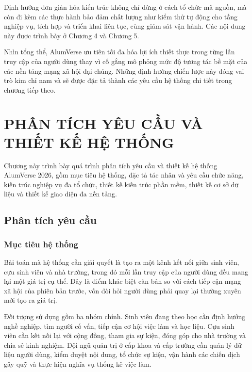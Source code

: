 \documentclass[12pt,a4paper,oneside]{report}
\begin{document}
Định hướng đơn giản hóa kiến trúc không chỉ dừng ở cách tổ chức mã nguồn, mà còn đi kèm các thực hành bảo đảm chất lượng như kiểm thử tự động cho tầng nghiệp vụ, tích hợp và triển khai liên tục, cùng giám sát vận hành. Các nội dung này được trình bày ở Chương 4 và Chương 5.

Nhìn tổng thể, AlumVerse ưu tiên tối đa hóa lợi ích thiết thực trong từng lần truy cập của người dùng thay vì cố gắng mô phỏng mức độ tương tác bề mặt của các nền tảng mạng xã hội đại chúng. Những định hướng chiến lược này đóng vai trò kim chỉ nam và sẽ được đặc tả thành các yêu cầu hệ thống chi tiết trong chương tiếp theo.

\chapter{PHÂN TÍCH YÊU CẦU VÀ THIẾT KẾ HỆ THỐNG}

Chương này trình bày quá trình phân tích yêu cầu và thiết kế hệ thống AlumVerse 2026, gồm mục tiêu hệ thống, đặc tả tác nhân và yêu cầu chức năng, kiến trúc nghiệp vụ đa tổ chức, thiết kế kiến trúc phần mềm, thiết kế cơ sở dữ liệu và thiết kế giao diện đa nền tảng.

\section{Phân tích yêu cầu}

\subsection{Mục tiêu hệ thống}

Bài toán mà hệ thống cần giải quyết là tạo ra một kênh kết nối giữa sinh viên, cựu sinh viên và nhà trường, trong đó mỗi lần truy cập của người dùng đều mang lại một giá trị cụ thể. Đây là điểm khác biệt căn bản so với cách tiếp cận mạng xã hội của phiên bản trước, vốn đòi hỏi người dùng phải quay lại thường xuyên mới tạo ra giá trị.

Đối tượng sử dụng gồm ba nhóm chính. Sinh viên đang theo học cần định hướng nghề nghiệp, tìm người cố vấn, tiếp cận cơ hội việc làm và học liệu. Cựu sinh viên cần kết nối lại với cộng đồng, tham gia sự kiện, đóng góp cho nhà trường và chia sẻ kinh nghiệm. Đội ngũ quản trị ở cấp khoa và cấp trường cần quản lý dữ liệu người dùng, kiểm duyệt nội dung, tổ chức sự kiện, vận hành các chiến dịch gây quỹ và thực hiện nghĩa vụ thống kê việc làm.
\end{document}
